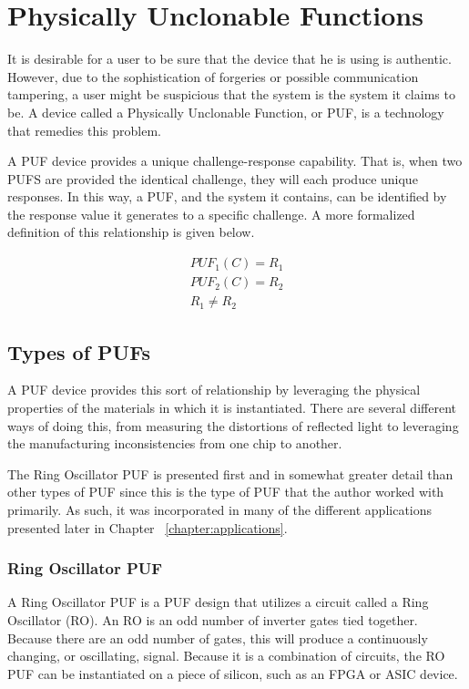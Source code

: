 
\chapter{Physically Unclonable Functions}
\label{chapter:pufoverview}
It is desirable for a user to be sure that the device that he is using is authentic. However, due to the sophistication
of forgeries or possible communication tampering, a user might be suspicious that the system is the system it claims
to be. A device called a Physically Unclonable Function, or PUF, is a technology that remedies this problem.

A PUF device provides a unique challenge-response capability. That is, when two PUFS are provided the identical
challenge, they will each produce unique responses. In this way, a PUF, and the system it contains, 
can be identified by the response value it generates to a specific challenge. A more formalized definition of
this relationship is given below.

\begin{align*}
PUF_1(C) = R_1\\
PUF_2(C) = R_2\\
R_1 \neq R_2
\end{align*}

\section{Types of PUFs}
A PUF device provides this sort of relationship by leveraging the physical properties
of the materials in which it is instantiated. There are several different ways of doing
this, from measuring the distortions of reflected light to leveraging the
manufacturing inconsistencies from one chip to another.

The Ring Oscillator PUF is presented first and in somewhat greater detail than
other types of PUF since this is the type of PUF that the author worked with primarily.
As such, it was incorporated in many of the different applications presented later in
Chapter ~\ref{chapter:applications}.

\subsection{Ring Oscillator PUF}
A Ring Oscillator PUF is a PUF design that utilizes a circuit called a Ring 
Oscillator (RO). An RO is an odd number of inverter gates tied together. Because
there are an odd number of gates, this will produce a continuously changing,
or oscillating, signal. Because it is a combination of circuits, the RO PUF can
be instantiated on a piece of silicon, such as an FPGA or ASIC device.

